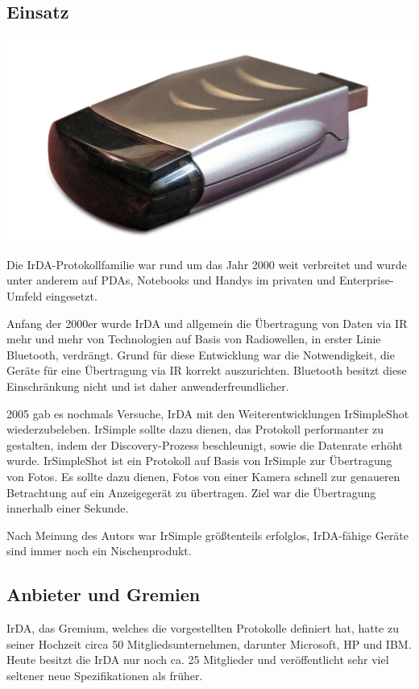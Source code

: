 \begin{multicols}{3}


\subsection*{Einsatz}
\begin{Figure}
\includegraphics[width=\linewidth]{Kapitel/IrDA/Grafiken/irda_usb.jpg}
\label{fig:irda.modem}
\end{Figure}
Die IrDA-Protokollfamilie war rund um das Jahr 2000 weit verbreitet und wurde unter anderem auf PDAs, Notebooks und Handys im privaten und Enterprise-Umfeld eingesetzt.

Anfang der 2000er wurde IrDA und allgemein die Übertragung von Daten via IR mehr und mehr von Technologien auf Basis von Radiowellen, in erster Linie Bluetooth, verdrängt. Grund für diese Entwicklung war die Notwendigkeit, die Geräte für eine Übertragung via IR korrekt auszurichten. Bluetooth besitzt diese Einschränkung nicht und ist daher anwenderfreundlicher.

2005 gab es nochmals Versuche, IrDA mit den Weiterentwicklungen IrSimpleShot wiederzubeleben. IrSimple sollte dazu dienen, das Protokoll performanter zu gestalten, indem der Discovery-Prozess beschleunigt, sowie die Datenrate erhöht wurde. IrSimpleShot ist ein Protokoll auf Basis von IrSimple zur Übertragung von Fotos. Es sollte dazu dienen, Fotos von einer Kamera schnell zur genaueren Betrachtung auf ein Anzeigegerät zu übertragen. Ziel war die Übertragung innerhalb einer Sekunde.

Nach Meinung des Autors war IrSimple größtenteils erfolglos, IrDA-fähige Geräte sind immer noch ein Nischenprodukt. 

\subsection*{Anbieter und Gremien}
IrDA, das Gremium, welches die vorgestellten Protokolle definiert hat, hatte zu seiner Hochzeit circa 50 Mitgliedsunternehmen, darunter Microsoft, HP und IBM. Heute besitzt die IrDA nur noch ca. 25 Mitglieder und veröffentlicht sehr viel seltener neue Spezifikationen als früher.


\end{multicols}
